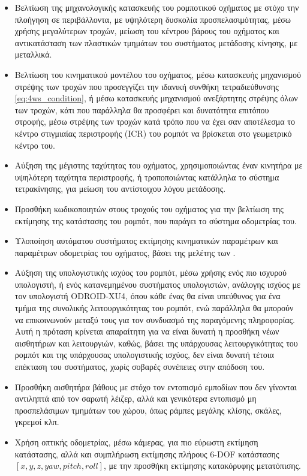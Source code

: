 \begin{itemize}
	\item Βελτίωση της μηχανολογικής κατασκευής του ρομποτικού οχήματος με στόχο την πλοήγηση σε περιβάλλοντα, με υψηλότερη δυσκολία προσπελασιμότητας, μέσω χρήσης μεγαλύτερων τροχών, μείωση του κέντρου βάρους του οχήματος και αντικατάσταση των πλαστικών τμημάτων του συστήματος μετάδοσης κίνησης, με μεταλλικά.
	\item Βελτίωση του κινηματικού μοντέλου του οχήματος, μέσω κατασκευής μηχανισμού στρέψης των τροχών που προσεγγίζει την ιδανική συνθήκη τετραδιεύθυνσης \ref{eq:4ws_condition}, ή μέσω κατασκευής μηχανισμού ανεξάρτητης στρέψης όλων των τροχών, κάτι που παράλληλα θα προσφέρει και δυνατότητα επιτόπου στροφής, μέσω στρέψης των τροχών κατά τρόπο που να έχει σαν αποτέλεσμα το κέντρο στιγμιαίας περιστροφής (ICR) του ρομπότ να βρίσκεται στο γεωμετρικό κέντρο του.
	\item Αύξηση της μέγιστης ταχύτητας του οχήματος, χρησιμοποιώντας έναν κινητήρα με υψηλότερη ταχύτητα περιστροφής, ή τροποποιώντας κατάλληλα το σύστημα τετρακίνησης, για μείωση του αντίστοιχου λόγου μετάδοσης.
	\item Προσθήκη κωδικοποιητών στους τροχούς του οχήματος για την βελτίωση της εκτίμησης της κατάστασης του ρομπότ, που παράγει το σύστημα οδομετρίας του.
	\item Υλοποίηση αυτόματου συστήματος εκτίμησης κινηματικών παραμέτρων και παραμέτρων οδομετρίας του οχήματος, βάσει της μελέτης των \citeauthor{automated_odometry} \cite{automated_odometry}.
	\item Αύξηση της υπολογιστικής ισχύος του ρομπότ, μέσω χρήσης ενός πιο ισχυρού υπολογιστή, ή ενός κατανεμημένου συστήματος υπολογιστών, ανάλογης ισχύος με τον υπολογιστή ODROID-XU4, όπου κάθε ένας θα είναι υπεύθυνος για ένα τμήμα της συνολικής λειτουργικότητας του ρομπότ, ενώ παράλληλα θα μπορούν να επικοινωνούν μεταξύ τους για τον συνδυασμό της παραγόμενης πληροφορίας. Αυτή η πρόταση κρίνεται απαραίτητη για να είναι δυνατή η προσθήκη νέων αισθητήρων και λειτουργιών, καθώς, βάσει της υπάρχουσας λειτουργικότητας του ρομπότ και της υπάρχουσας υπολογιστικής ισχύος, δεν είναι δυνατή τέτοια επέκταση του συστήματος, χωρίς σοβαρές συνέπειες στην απόδοση του.
	\item Προσθήκη αισθητήρα βάθους με στόχο τον εντοπισμό εμποδίων που δεν γίνονται αντιληπτά από τον σαρωτή λέιζερ, αλλά και γενικότερα εντοπισμό μη προσπελάσιμων τμημάτων του χώρου, όπως ράμπες μεγάλης κλίσης, σκάλες, γκρεμοί κλπ.
	\item Χρήση οπτικής οδομετρίας, μέσω κάμερας, για πιο εύρωστη εκτίμηση κατάστασης, αλλά και συμπλήρωση εκτίμησης πλήρους 6-DOF κατάστασης $[x,y,z,yaw,pitch,roll]$, με την προσθήκη εκτίμησης κατακόρυφης μετατόπισης.

\end{itemize}
